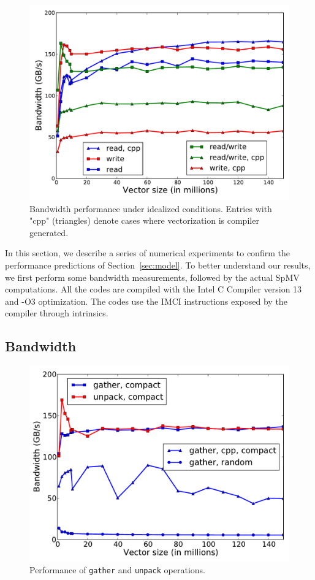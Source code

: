 \documentclass{sig-alternate}
\begin{document}
\begin{figure}[t]
  \centering
  \includegraphics[width=.9\linewidth]{figures/bandwidth_read_write.pdf}
  
  \caption{Bandwidth performance under idealized conditions.  Entries
    with "cpp" (triangles) denote cases where vectorization is
    compiler generated.}
  \label{fig:bandwidth}
  \label{fig:band_rw_MIC}
\end{figure}

In this section, we describe a series of numerical experiments to
confirm the performance predictions of Section~\ref{sec:model}. To
better understand our results, we first perform some bandwidth
measurements, followed by the actual SpMV computations. All the codes
are compiled with the Intel C Compiler version 13 and
\mbox{-O3} optimization. The codes use the IMCI instructions exposed by
the compiler through intrinsics.

\subsection{Bandwidth}


\begin{figure}[t]
  \centering
  \includegraphics[width=.9\linewidth]{figures/bandwidth_gather_unpack.pdf}
  \caption{Performance of {\tt gather} and {\tt unpack} operations.}
  \label{fig:band_gather} 
\end{figure}
\end{document}
